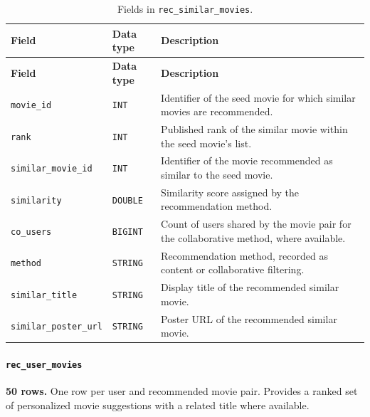 \documentclass[a4paper,12pt]{article}
\newcommand{\dbsep}{\_\allowbreak}
\begin{document}
\begingroup
\small
\setlength{\tabcolsep}{4pt}
\renewcommand{\arraystretch}{1.1}
\begin{longtable}{@{}>{\raggedright\arraybackslash}p{}
                    >{\raggedright\arraybackslash}p{}
                    >{\raggedright\arraybackslash}p{}@{}}
\caption{Fields in \texttt{rec\dbsep similar\dbsep movies}.}\\
\toprule
\textbf{Field} & \textbf{Data type} & \textbf{Description}\\
\midrule
\endfirsthead
\toprule
\textbf{Field} & \textbf{Data type} & \textbf{Description}\\
\midrule
\endhead
\bottomrule
\endfoot
\texttt{movie\dbsep id} & \texttt{INT} & Identifier of the seed movie for which similar movies are recommended.\\
\texttt{rank} & \texttt{INT} & Published rank of the similar movie within the seed movie's list.\\
\texttt{similar\dbsep movie\dbsep id} & \texttt{INT} & Identifier of the movie recommended as similar to the seed movie.\\
\texttt{similarity} & \texttt{DOUBLE} & Similarity score assigned by the recommendation method.\\
\texttt{co\dbsep users} & \texttt{BIGINT} & Count of users shared by the movie pair for the collaborative method, where available.\\
\texttt{method} & \texttt{STRING} & Recommendation method, recorded as content or collaborative filtering.\\
\texttt{similar\dbsep title} & \texttt{STRING} & Display title of the recommended similar movie.\\
\texttt{similar\dbsep poster\dbsep url} & \texttt{STRING} & Poster URL of the recommended similar movie.\\
\end{longtable}
\endgroup

\paragraph{\texttt{rec\dbsep user\dbsep movies}}
\textbf{50 rows.} One row per user and recommended movie pair.
Provides a ranked set of personalized movie suggestions with a related title where available.
\end{document}

